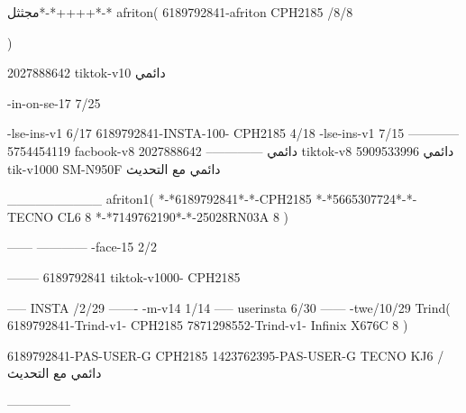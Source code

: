 مجثثل*-*++++*-*
afriton(
6189792841-afriton CPH2185  /8/8

)

2027888642 tiktok-v10
دائمي

-in-on-se-17 7/25

-lse-ins-v1 6/17
6189792841-INSTA-100- CPH2185 4/18
-lse-ins-v1 7/15
------------
5754454119 facbook-v8
دائمي
--------------
2027888642 tiktok-v8
دائمي
5909533996 tik-v1000  SM-N950F
دائمي مع التحديث

__________
afriton1(
*-*6189792841*-*-CPH2185
*-*5665307724*-*-TECNO CL6  8\1
*-*7149762190*-*-25028RN03A  8
)


------
------------
-face-15 2/2

--------
6189792841 tiktok-v1000- CPH2185 


-----
 INSTA /2/29
-------
-m-v14 1/14
-----
userinsta 6/30
------
-twe/10/29
Trind(
6189792841-Trind-v1- CPH2185 
7871298552-Trind-v1-  Infinix X676C  8\2
)


6189792841-PAS-USER-G CPH2185 
1423762395-PAS-USER-G TECNO KJ6  /دائمي مع التحديث

    ---------------
